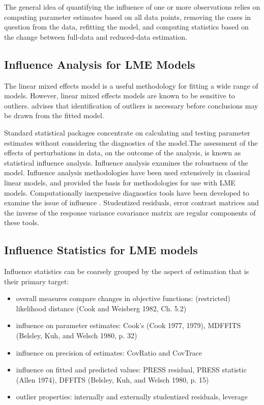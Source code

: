 \documentclass[12pt, a4paper]{report}
\theoremstyle{plain}
\theoremstyle{definition}
\theoremstyle{remark}
\begin{document}
The general idea of quantifying the influence of one or more observations relies on computing parameter estimates based on all data points, removing the cases in question from the data, refitting the model, and computing statistics based on the change between full-data and reduced-data estimation. 



\subsection{Influence Analysis for LME Models} %
The linear mixed effects model is a useful methodology for fitting a wide range of models. However, linear mixed effects models are known to be sensitive to outliers. \citet{CPJ} advises that identification of outliers is necessary before conclusions may be drawn from the fitted model.

Standard statistical packages concentrate on calculating and testing parameter estimates without considering the diagnostics of the model.The assessment of the effects of perturbations in data, on the outcome of the analysis, is known as statistical influence analysis. Influence analysis examines the robustness of the model. Influence analysis methodologies have been used extensively in classical linear models, and provided the basis for methodologies for use with LME models.
Computationally inexpensive diagnostics tools have been developed to examine the issue of influence \citep{Zewotir}.
Studentized residuals, error contrast matrices and the inverse of the response variance covariance matrix are regular components of these tools.

\subsection{Influence Statistics for LME models} %
Influence statistics can be coarsely grouped by the aspect of estimation that is their primary target:
\begin{itemize}
\item overall measures compare changes in objective functions: (restricted) likelihood distance (Cook and Weisberg 1982, Ch. 5.2)
\item influence on parameter estimates: Cook's  (Cook 1977, 1979), MDFFITS (Belsley, Kuh, and Welsch 1980, p. 32)
\item influence on precision of estimates: CovRatio and CovTrace
\item influence on fitted and predicted values: PRESS residual, PRESS statistic (Allen 1974), DFFITS (Belsley, Kuh, and Welsch 1980, p. 15)
\item outlier properties: internally and externally studentized residuals, leverage
\end{itemize}
\end{document}
